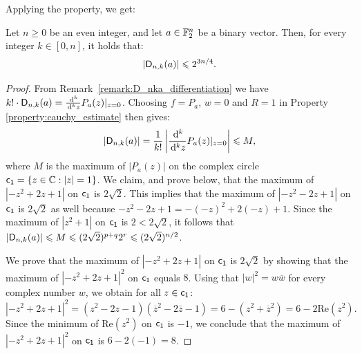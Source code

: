 \documentclass[11pt]{llncs}
\begin{document}




Applying the property, we get:

\begin{theorem}\label{theorem:bound_D_nka}
    Let $n\geq 0$ be an even integer, and let $a\in\mathbb{F}_2^n$ be a binary vector. Then, for every integer $k\in[0,n]$, it holds that:
    \[
        |\mathsf{D}_{n,k}(a)|\leqslant 2^{3n/4}.
    \]
\end{theorem}

\begin{proof}
    From Remark~\ref{remark:D_nka_differentiation} we have $k!\cdot\mathsf{D}_{n,k}(a)=\frac{\,\mathrm d^k}{\,\mathrm d^k z}P_a(z)\vert_{z=0}$. Choosing $f=P_a$, $w=0$ and $R=1$ in Property \ref{property:cauchy_estimate} then gives:
    \[
        |\mathsf{D}_{n,k}(a)|=\frac{1}{k!}\left|\frac{\,\mathrm d^k}{\,\mathrm d^k z}P_a(z)\vert_{z=0}\right|\leqslant M,
    \]
    where $M$ is the maximum of $|P_a(z)|$ on the complex circle %
    $\mathsf{c_1}=\{ z \in \mathbb{C}: |z|=1  \}$.
    We claim, and prove below, that the maximum of $\left|-z^2+2z+1\right|$ on $\mathsf{c_1}$ is $2\sqrt 2$. 
    This implies that the maximum of $\left|-z^2-2z+1\right|$ on $\mathsf{c_1}$ is $2\sqrt 2$ as well because $-z^2-2z+1=-(-z)^2+2(-z)+1$. 
    Since the maximum of $\left|z^2+1\right|$ on $\mathsf{c_1}$ is $2<2\sqrt 2$, it follows that $|\mathsf{D}_{n,k}(a)|\leqslant M\leqslant (2\sqrt 2)^{p+q}2^r\leqslant (2\sqrt 2)^{n/2}$.

	We prove that the maximum of $\left|-z^2+2z+1\right|$ on $\mathsf{c_1}$ is $2\sqrt 2$ by showing that the maximum of $\left|-z^2+2z+1\right|^2$ on $\mathsf{c_1}$ equals $8$.
    Using that $|w|^2=w\overline w$ for every complex number $w$, we obtain for all $z\in \mathsf{c_1}$:
    \[
        \left|-z^2+2z+1\right|^2=\left(z^2-2z-1\right)\left(\overline z^2-2\overline z-1\right)=6-\left(z^2+\overline z^2\right)=6-2\mathrm{Re}\left(z^2\right).
    \]
    Since the minimum of $\mathrm{Re}\left(z^2\right)$ on $\mathsf{c_1}$ is $-1$, we conclude that the maximum of $\left|-z^2+2z+1\right|^2$ on $\mathsf{c_1}$ is $6-2(-1)=8$.
\end{proof}
\end{document}
